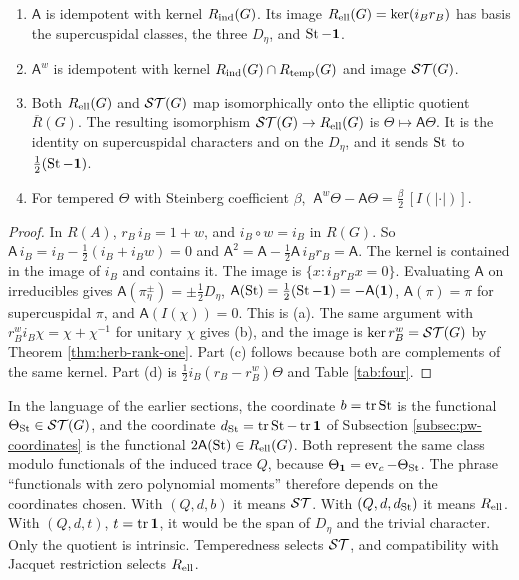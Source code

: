 \begin{theorem}\label{thm:twosplit}\begin{enumerate}[label=(\alph*),leftmargin=*]
\item $\mathsf A$ is idempotent with kernel $R_{\rm ind}(G)$. Its image $R_{\rm ell}(G)=\ker(i_Br_B)$ has basis the supercuspidal classes, the three $D_\eta$, and $\operatorname{St}-\mathbf 1$.
\item $\mathsf A^w$ is idempotent with kernel $R_{\rm ind}(G)\cap R_{\rm temp}(G)$ and image $\mathcal{ST}(G)$.
\item Both $R_{\rm ell}(G)$ and $\mathcal{ST}(G)$ map isomorphically onto the elliptic quotient $\overline R(G)$. The resulting isomorphism $\mathcal{ST}(G)\to R_{\rm ell}(G)$ is $\Theta\mapsto\mathsf A\Theta$. It is the identity on supercuspidal characters and on the $D_\eta$, and it sends $\operatorname{St}$ to $\tfrac12(\operatorname{St}-\mathbf 1)$.
\item For tempered $\Theta$ with Steinberg coefficient $\beta$, $\ \mathsf A^w\Theta-\mathsf A\Theta=\tfrac\beta2\,[I(|\cdot|)]$.
\end{enumerate}
\end{theorem}
\begin{proof}
In $R(A)$, $r_B\,i_B=1+w$, and $i_B\circ w=i_B$ in $R(G)$. So $\mathsf A\,i_B=i_B-\tfrac12(i_B+i_Bw)=0$ and $\mathsf A^2=\mathsf A-\tfrac12\mathsf A\,i_Br_B=\mathsf A$. The kernel is contained in the image of $i_B$ and contains it. The image is $\{x:i_Br_Bx=0\}$. Evaluating $\mathsf A$ on irreducibles gives $\mathsf A(\pi_\eta^\pm)=\pm\tfrac12D_\eta$, $\mathsf A(\operatorname{St})=\tfrac12(\operatorname{St}-\mathbf 1)=-\mathsf A(\mathbf 1)$, $\mathsf A(\pi)=\pi$ for supercuspidal $\pi$, and $\mathsf A(I(\chi))=0$. This is (a). The same argument with $r_B^wi_B\chi=\chi+\chi^{-1}$ for unitary $\chi$ gives (b), and the image is $\ker r_B^w=\mathcal{ST}(G)$ by Theorem \ref{thm:herb-rank-one}. Part (c) follows because both are complements of the same kernel. Part (d) is $\tfrac12i_B(r_B-r_B^w)\Theta$ and Table \ref{tab:four}.
\end{proof}

In the language of the earlier sections, the coordinate $b=\operatorname{tr}\operatorname{St}$ is the functional $\Theta_{\operatorname{St}}\in\mathcal{ST}(G)$, and the coordinate $d_{\operatorname{St}}=\operatorname{tr}\operatorname{St}-\operatorname{tr}\mathbf 1$ of Subsection \ref{subsec:pw-coordinates} is the functional $2\mathsf A(\operatorname{St})\in R_{\rm ell}(G)$. Both represent the same class modulo functionals of the induced trace $Q$, because $\Theta_{\mathbf 1}=\operatorname{ev}_c-\Theta_{\operatorname{St}}$. The phrase ``functionals with zero polynomial moments'' therefore depends on the coordinates chosen. With $(Q,d,b)$ it means $\mathcal{ST}$. With $(Q,d,d_{\operatorname{St}})$ it means $R_{\rm ell}$. With $(Q,d,t)$, $t=\operatorname{tr}\mathbf 1$, it would be the span of $D_\eta$ and the trivial character. Only the quotient is intrinsic. Temperedness selects $\mathcal{ST}$, and compatibility with Jacquet restriction selects $R_{\rm ell}$.

